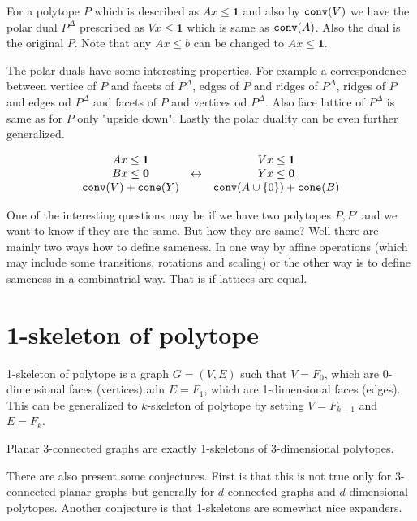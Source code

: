 For a polytope $P$ which is described as $A x \leq \bm{1}$ and also by $\mathtt{conv}(V)$ we have the polar dual $P^{\Delta}$ prescribed as $V x \leq \bm{1}$ which is same as $\mathtt{conv}(A)$. Also the dual is the original $P$. Note that any $A x \leq b$ can be changed to $A x \leq \bm{1}$.

The polar duals have some interesting properties. For example a correspondence between vertice of $P$ and facets of $P^{\Delta}$, edges of $P$ and ridges of $P^{\Delta}$, ridges of $P$ and edges od $P^{\Delta}$ and facets of $P$ and vertices od $P^{\Delta}$. Also face lattice of $P^{\Delta}$ is same as for $P$ only "upside down". Lastly the polar duality can be even further generalized.

$$
\begin{array}{c c c}
	A x \leq \bm{1} &  & V x \leq \bm{1} \\
	B x \leq \bm{0} & \leftrightarrow & Y x \leq \bm{0} \\
	\mathtt{conv}(V) + \mathtt{cone}(Y) & & \mathtt{conv}(A \cup \{0\}) + \mathtt{cone}(B)
\end{array}
$$

One of the interesting questions may be if we have two polytopes $P,P'$ and we want to know if they are the same. But how they are same? Well there are mainly two ways how to define sameness. In one way by affine operations (which may include some transitions, rotations and scaling) or the other way is to define sameness in a combinatrial way. That is if lattices are equal.

\section{1-skeleton of polytope}

\begin{defn}
	1-skeleton of polytope is a graph $G = (V,E)$ such that $V = F_{0}$, which are 0-dimensional faces (vertices) adn $E = F_{1}$, which are 1-dimensional faces (edges). This can be generalized to $k$-skeleton of polytope by setting $V = F_{k-1}$ and $E = F_{k}$.
\end{defn}

\begin{thm}[Steinitz]
	Planar 3-connected graphs are exactly 1-skeletons of 3-dimensional polytopes.
\end{thm}

There are also present some conjectures. First is that this is not true only for 3-connected planar graphs but generally for $d$-connected graphs and $d$-dimensional polytopes. Another conjecture is that 1-skeletons are somewhat nice expanders.


